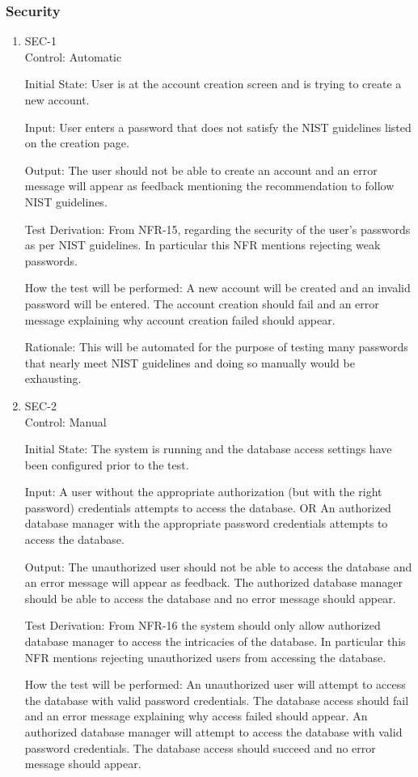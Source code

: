 \documentclass[12pt, titlepage]{article}
\begin{document}
\subsubsection {Security}
\begin{enumerate}
  \item{SEC-1\\}
  Control: Automatic

  Initial State: User is at the account creation screen and is trying to create a new account.

  Input: User enters a password that does not satisfy the NIST guidelines listed on the creation page.
  
  Output: The user should not be able to create an account and an 
  error message will appear as feedback mentioning the recommendation to follow NIST guidelines.

  Test Derivation: From NFR-15, regarding the security of the user's passwords as per NIST guidelines.
  In particular this NFR mentions rejecting weak passwords.

  How the test will be performed: A new account will be created and an invalid password will be entered. 
  The account creation should fail and an error message explaining why account creation failed
  should appear. 
  
  Rationale: This will be automated for the purpose of testing many passwords 
  that nearly meet NIST guidelines and doing so manually would be exhausting.
  
  \item {SEC-2\\}
  Control: Manual

  Initial State: The system is running and the 
  database access settings have been configured prior to the test. 

  Input: A user without the appropriate authorization (but with the right password) credentials attempts to access the database.
  OR An authorized database manager
  with the appropriate password credentials attempts to access the database.
  
  Output: The unauthorized user should not be able to access the database and an error message will appear as feedback.
  The authorized database manager should be able to access the database and no error message should appear.

  Test Derivation: From NFR-16 the system should only allow authorized database manager to access the 
  intricacies of the database. In particular this NFR mentions rejecting unauthorized users from accessing the database.
  
  How the test will be performed: An unauthorized user will attempt to access the database with valid password credentials.
  The database access should fail and an error message explaining why access failed should appear.
  An authorized database manager will attempt to access the database with valid password credentials.
  The database access should succeed and no error message should appear.

\end{enumerate}
\end{document}
